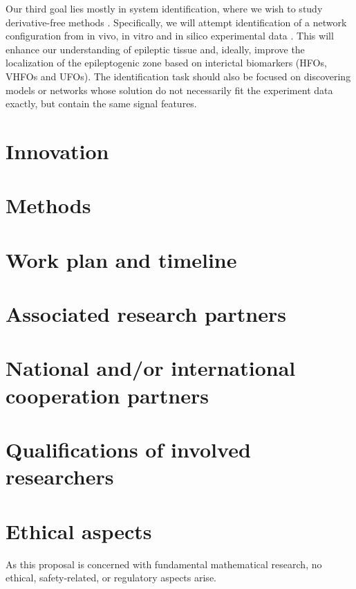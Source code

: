 \documentclass[a4paper,11pt]{scrartcl}
\begin{document}
Our third goal lies mostly in system identification, where we wish to study derivative-free methods \cite{Bortz2023, Lejarza2022, Messenger2024}. Specifically, we will attempt identification of a network configuration from in vivo, in vitro and in silico experimental data \cite{Champion2019}. This will enhance our understanding of epileptic tissue and, ideally, improve the localization of the epileptogenic zone based on interictal biomarkers (HFOs, VHFOs and UFOs). The identification task should also be focused on discovering models or networks whose solution do not necessarily fit the experiment data exactly, but contain the same signal features.

\section{Innovation}\label{sec:innovation}

\section{Methods}\label{sec:methods}

\section{Work plan and timeline}\label{sec:workplan}

\section{Associated research partners}\label{sec:partners}

\section{National and/or international cooperation partners}\label{sec:cooperations}


\section{Qualifications of involved researchers}\label{sec:qualifications}

\section{Ethical aspects}\label{sec:ethics}

As this proposal is concerned with fundamental mathematical research, no ethical, safety-related, or regulatory aspects arise.
\end{document}
